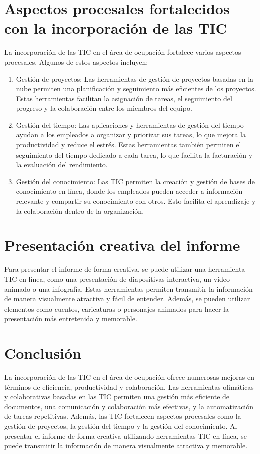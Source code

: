 \documentclass{article}
\theoremstyle{mytheoremstyle}
\theoremstyle{mytheoremstyle}
\theoremstyle{myproblemstyle}
\begin{document}
\section{Aspectos procesales fortalecidos con la incorporación de las TIC}

La incorporación de las TIC en el área de ocupación fortalece varios aspectos procesales. Algunos de estos aspectos incluyen:

\begin{enumerate}
  \item Gestión de proyectos: Las herramientas de gestión de proyectos basadas en la nube permiten una planificación y seguimiento más eficientes de los proyectos. Estas herramientas facilitan la asignación de tareas, el seguimiento del progreso y la colaboración entre los miembros del equipo.
  
  \item Gestión del tiempo: Las aplicaciones y herramientas de gestión del tiempo ayudan a los empleados a organizar y priorizar sus tareas, lo que mejora la productividad y reduce el estrés. Estas herramientas también permiten el seguimiento del tiempo dedicado a cada tarea, lo que facilita la facturación y la evaluación del rendimiento.
  
  \item Gestión del conocimiento: Las TIC permiten la creación y gestión de bases de conocimiento en línea, donde los empleados pueden acceder a información relevante y compartir su conocimiento con otros. Esto facilita el aprendizaje y la colaboración dentro de la organización.
\end{enumerate}

\section{Presentación creativa del informe}

Para presentar el informe de forma creativa, se puede utilizar una herramienta TIC en línea, como una presentación de diapositivas interactiva, un video animado o una infografía. Estas herramientas permiten transmitir la información de manera visualmente atractiva y fácil de entender. Además, se pueden utilizar elementos como cuentos, caricaturas o personajes animados para hacer la presentación más entretenida y memorable.

\section{Conclusión}

La incorporación de las TIC en el área de ocupación ofrece numerosas mejoras en términos de eficiencia, productividad y colaboración. Las herramientas ofimáticas y colaborativas basadas en las TIC permiten una gestión más eficiente de documentos, una comunicación y colaboración más efectivas, y la automatización de tareas repetitivas. Además, las TIC fortalecen aspectos procesales como la gestión de proyectos, la gestión del tiempo y la gestión del conocimiento. Al presentar el informe de forma creativa utilizando herramientas TIC en línea, se puede transmitir la información de manera visualmente atractiva y memorable.
\end{document}

